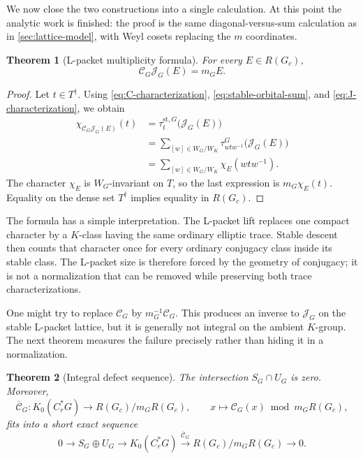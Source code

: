 \documentclass[11pt]{amsart}
\newtheorem{theorem}{Theorem}[section]
\theoremstyle{definition}
\theoremstyle{remark}
\newcommand{\Cr}{C_r^*}
\newcommand{\st}{\mathrm{st}}
\begin{document}
We now close the two constructions into a single calculation.  At this point the analytic work is finished: the proof is the same diagonal-versus-sum calculation as in \cref{sec:lattice-model}, with Weyl cosets replacing the \(m\) coordinates.

\begin{theorem}[L-packet multiplicity formula]\label{thm:CJ}
For every $E\in R(G_c)$,
\begin{equation}\label{eq:CJ}
  \mathcal C_G\mathcal J_G(E)=m_GE.
\end{equation}
\end{theorem}

\begin{proof}
Let $t\in T^\dagger$.  Using \eqref{eq:C-characterization}, \eqref{eq:stable-orbital-sum}, and \eqref{eq:J-characterization}, we obtain
\begin{align*}
  \chi_{\mathcal C_G\mathcal J_G(E)}(t)
  &=\tau_t^{\st,G}\bigl(\mathcal J_G(E)\bigr)\\
  &=\sum_{[w]\in W_G/W_K}
    \tau_{wtw^{-1}}^G\bigl(\mathcal J_G(E)\bigr)\\
  &=\sum_{[w]\in W_G/W_K}\chi_E(wtw^{-1}).
\end{align*}
The character $\chi_E$ is $W_G$-invariant on $T$, so the last expression is $m_G\chi_E(t)$.  Equality on the dense set $T^\dagger$ implies equality in $R(G_c)$.
\end{proof}

The formula has a simple interpretation.  The L-packet lift replaces one compact character by a \(K\)-class having the same ordinary elliptic trace.  Stable descent then counts that character once for every ordinary conjugacy class inside its stable class.  The L-packet size is therefore forced by the geometry of conjugacy; it is not a normalization that can be removed while preserving both trace characterizations.

One might try to replace \(\mathcal C_G\) by \(m_G^{-1}\mathcal C_G\).  This produces an inverse to \(\mathcal J_G\) on the stable L-packet lattice, but it is generally not integral on the ambient \(K\)-group.  The next theorem measures the failure precisely rather than hiding it in a normalization.

\begin{theorem}[Integral defect sequence]\label{thm:defect}
The intersection $S_G\cap U_G$ is zero.  Moreover,
\[
  \overline{\mathcal C}_G:K_0(\Cr G)\longrightarrow R(G_c)/m_GR(G_c),
  \qquad
  x\longmapsto\mathcal C_G(x)\bmod m_GR(G_c),
\]
fits into a short exact sequence
\begin{equation}\label{eq:defect-sequence}
  0\longrightarrow S_G\oplus U_G
  \longrightarrow K_0(\Cr G)
  \overset{\overline{\mathcal C}_G}{\longrightarrow}
  R(G_c)/m_GR(G_c)
  \longrightarrow0.
\end{equation}
\end{theorem}
\end{document}
